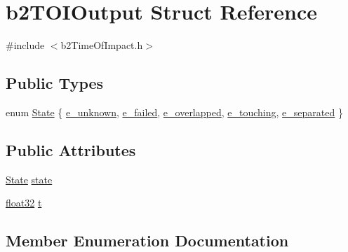 \hypertarget{structb2_t_o_i_output}{}\section{b2\+T\+O\+I\+Output Struct Reference}
\label{structb2_t_o_i_output}


{\ttfamily \#include $<$b2\+Time\+Of\+Impact.\+h$>$}

\subsection*{Public Types}
\begin{DoxyCompactItemize}
\item 
enum \mbox{\hyperlink{structb2_t_o_i_output_a12c3cf4dc0551f5c8249dc1dd867959a}{State}} \{ \newline
\mbox{\hyperlink{structb2_t_o_i_output_a12c3cf4dc0551f5c8249dc1dd867959aab73a45bbab8c3b7d82a6b43ec66ff3c5}{e\+\_\+unknown}}, 
\mbox{\hyperlink{structb2_t_o_i_output_a12c3cf4dc0551f5c8249dc1dd867959aac25604b5e961c2f50353d0c5114b0f2f}{e\+\_\+failed}}, 
\mbox{\hyperlink{structb2_t_o_i_output_a12c3cf4dc0551f5c8249dc1dd867959aa305f55a9143e09cf416f6a994c786c84}{e\+\_\+overlapped}}, 
\mbox{\hyperlink{structb2_t_o_i_output_a12c3cf4dc0551f5c8249dc1dd867959aa4d4178a0a0f89410d1b6b3a49f0c08d9}{e\+\_\+touching}}, 
\newline
\mbox{\hyperlink{structb2_t_o_i_output_a12c3cf4dc0551f5c8249dc1dd867959aad8752c7cabc15b4522bd97e99acf66d1}{e\+\_\+separated}}
 \}
\end{DoxyCompactItemize}
\subsection*{Public Attributes}
\begin{DoxyCompactItemize}
\item 
\mbox{\hyperlink{structb2_t_o_i_output_a12c3cf4dc0551f5c8249dc1dd867959a}{State}} \mbox{\hyperlink{structb2_t_o_i_output_aaacbf28f437b965ffecabf1407a77915}{state}}
\item 
\mbox{\hyperlink{b2_settings_8h_aacdc525d6f7bddb3ae95d5c311bd06a1}{float32}} \mbox{\hyperlink{structb2_t_o_i_output_a94f8b756e060892226ec006db4be7ee3}{t}}
\end{DoxyCompactItemize}


\subsection{Member Enumeration Documentation}
\mbox{\label{structb2_t_o_i_output_a12c3cf4dc0551f5c8249dc1dd867959a}} 
